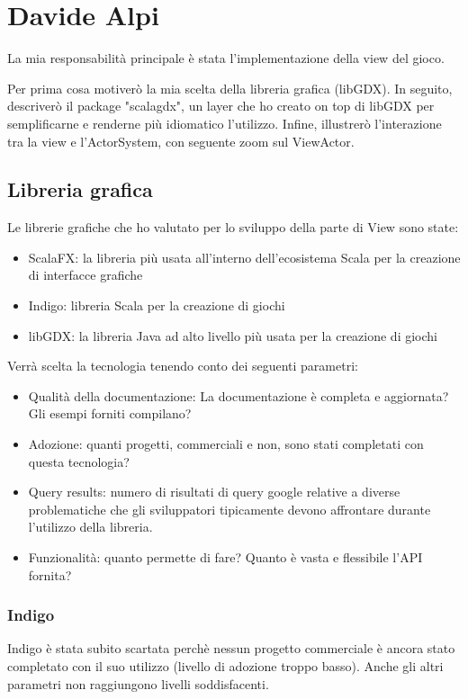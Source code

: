\section{Davide Alpi}
La mia responsabilità principale è stata l'implementazione della view del gioco.

Per prima cosa motiverò la mia scelta della libreria grafica (libGDX).
In seguito, descriverò il package "scalagdx", un layer che ho creato on top di libGDX per semplificarne e renderne più idiomatico l'utilizzo.
Infine, illustrerò l'interazione tra la view e l'ActorSystem, con seguente zoom sul ViewActor.


\subsection{Libreria grafica}
\label{sec:view}

Le librerie grafiche che ho valutato per lo sviluppo della parte di View sono state:
\begin{itemize}
    \item ScalaFX: la libreria più usata all'interno dell'ecosistema Scala per la creazione di interfacce grafiche
    \item Indigo: libreria Scala per la creazione di giochi
    \item libGDX: la libreria Java ad alto livello più usata per la creazione di giochi
\end{itemize}
Verrà scelta la tecnologia tenendo conto dei seguenti parametri:
\begin{itemize}
    \item Qualità della documentazione: La documentazione è completa e aggiornata? Gli esempi forniti compilano? 
    \item Adozione: quanti progetti, commerciali e non, sono stati completati con questa tecnologia?
    \item Query results: numero di risultati di query google relative a diverse problematiche che gli sviluppatori tipicamente devono affrontare durante l'utilizzo della libreria.
    \item Funzionalità: quanto permette di fare? Quanto è vasta e flessibile l'API fornita?
\end{itemize}

\subsubsection{Indigo}
Indigo è stata subito scartata perchè nessun progetto commerciale è ancora stato completato con il suo utilizzo (livello di adozione troppo basso). Anche gli altri parametri non raggiungono livelli soddisfacenti.

